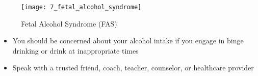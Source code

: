 \documentclass[title={Chapter 7}]{fdsn201notes}
\begin{document}
\begin{figure}[H]
	\centering
	\texttt{[image: 7\_fetal\_alcohol\_syndrome]}
	\caption{Fetal Alcohol Syndrome (FAS)}
	\label{fig:fetal_alcohol_syndrome}
\end{figure}

\begin{itemize}
	\item You should be concerned about your alcohol intake if you engage in binge drinking or drink at inappropriate times
	\item Speak with a trusted friend, coach, teacher, counselor, or healthcare provider
\end{itemize}
\end{document}
